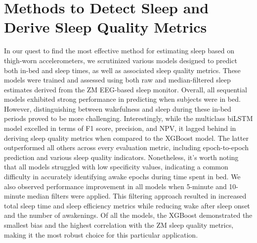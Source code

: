 \documentclass[
  10pt,
]{scrbook}
\begin{document}
\hypertarget{methods-to-detect-sleep-and-derive-sleep-quality-metrics}{%
\section{Methods to Detect Sleep and Derive Sleep Quality
Metrics}\label{methods-to-detect-sleep-and-derive-sleep-quality-metrics}}

In our quest to find the most effective method for estimating sleep
based on thigh-worn accelerometers, we scrutinized various models
designed to predict both in-bed and sleep times, as well as associated
sleep quality metrics. These models were trained and assessed using both
raw and median-filtered sleep estimates derived from the ZM EEG-based
sleep monitor. Overall, all sequential models exhibited strong
performance in predicting when subjects were in bed. However,
distinguishing between wakefulness and sleep during these in-bed periods
proved to be more challenging. Interestingly, while the multiclass
biLSTM model excelled in terms of F1 score, precision, and NPV, it
lagged behind in deriving sleep quality metrics when compared to the
XGBoost model. The latter outperformed all others across every
evaluation metric, including epoch-to-epoch prediction and various sleep
quality indicators. Nonetheless, it's worth noting that all models
struggled with low specificity values, indicating a common difficulty in
accurately identifying awake epochs during time spent in bed. We also
observed performance improvement in all models when 5-minute and
10-minute median filters were applied. This filtering approach resulted
in increased total sleep time and sleep efficiency metrics while
reducing wake after sleep onset and the number of awakenings. Of all the
models, the XGBoost demonstrated the smallest bias and the highest
correlation with the ZM sleep quality metrics, making it the most robust
choice for this particular application.
\end{document}
